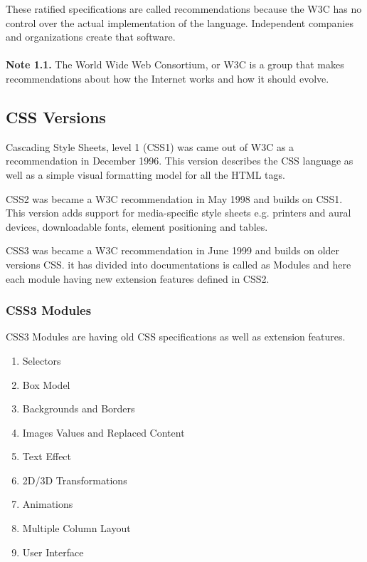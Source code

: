 \documentclass[a4paper,oneside]{book}
\numberwithin{equation}{chapter}
\begin{document}
These ratified specifications are called recommendations because the W3C has no control over the actual implementation of the language. Independent companies and organizations create that software.\\
\\
\textbf{Note 1.1.} The World Wide Web Consortium, or W3C is a group that makes recommendations about how the Internet works and how it should evolve.
\subsection{CSS Versions}
Cascading Style Sheets, level 1 (CSS1) was came out of W3C as a recommendation in December 1996. This version describes the CSS language as well as a simple visual formatting model for all the HTML tags.

CSS2 was became a W3C recommendation in May 1998 and builds on CSS1. This version adds support for media-specific style sheets e.g. printers and aural devices, downloadable fonts, element positioning and tables.

CSS3 was became a W3C recommendation in June 1999 and builds on older versions CSS. it has divided into documentations is called as Modules and here each module having new extension features defined in CSS2.
\subsubsection{CSS3 Modules}
CSS3 Modules are having old CSS specifications as well as extension features.
\begin{enumerate}
\item Selectors
\item Box Model
\item Backgrounds and Borders
\item Images Values and Replaced Content
\item Text Effect
\item 2D/3D Transformations
\item Animations
\item Multiple Column Layout
\item User Interface
\end{enumerate}
\end{document}
